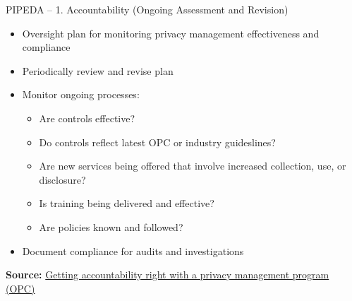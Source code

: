\documentclass[ignorenonframetext,xcolor=x11names]{beamer}
\begin{document}
\begin{frame}{PIPEDA -- 1. Accountability \small (Ongoing Assessment and Revision)}
\begin{itemize}
  \item Oversight plan for monitoring privacy management effectiveness and compliance
  \item Periodically review and revise plan
  \item Monitor ongoing processes:
  \begin{itemize}
     \item Are controls effective?
     \item Do controls reflect latest OPC or industry guideslines?
     \item Are new services being offered that involve increased collection, use, or disclosure?
     \item Is training being delivered and effective?
     \item Are policies known and followed?
  \end{itemize}
  \item Document compliance for audits and investigations
\end{itemize}

\vspace{\baselineskip}
\scriptsize \textbf{Source:} \href{https://www.priv.gc.ca/en/privacy-topics/privacy-laws-in-canada/the-personal-information-protection-and-electronic-documents-act-pipeda/pipeda-compliance-help/pipeda-compliance-and-training-tools/gl_acc_201204/}{Getting accountability right with a privacy management program (OPC)}
\end{frame} 
\end{document}
